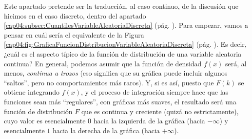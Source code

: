 Este apartado pretende ser la traducción, al caso continuo, de la discusión que hicimos en el caso discreto, dentro del apartado \ref{cap04:subsec:CuantilesVariableAleatoriaDiscreta} (pág. \pageref{cap04:subsec:CuantilesVariableAleatoriaDiscreta}). Para empezar, vamos a pensar en cuál sería el equivalente de la Figura \ref{cap04:fig:GraficaFuncionDistribucionVariableAleatoriaDiscreta} (pág. \pageref{cap04:fig:GraficaFuncionDistribucionVariableAleatoriaDiscreta}). Es decir, ¿cuál es el aspecto típico de la función de distribución de una variable aleatoria continua? En general, podemos asumir que la función de densidad $f(x)$ será, al menos, {\em continua a trozos} (eso significa que su gráfica puede incluir algunos ``saltos'', pero no comportamientos más raros). Y, si es así, puesto que $F(k)$ se obtiene integrando $f(x)$, y el proceso de integración siempre hace que las funciones sean más ``regulares'', con gráficas más suaves,  el resultado será una función de distribución $F$ que es continua y creciente (quizá no estrictamente), cuyo valor es esencialmente $0$ hacia la izquierda de la gráfica (hacia $-\infty$) y esencialmente $1$ hacia la derecha de la gráfica (hacia $+\infty$).

